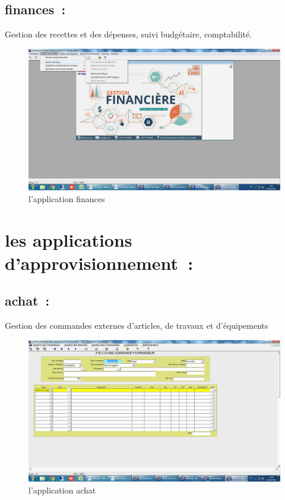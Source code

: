 \documentclass[12pt]{rapportINPTCLOUD}
\begin{document}
\subsection{finances :} Gestion des recettes et des dépenses, suivi budgétaire, comptabilité.
\begin{figure}[H]
\centering
\includegraphics[width=1\linewidth]{img/d.jpg}
\caption{l'application finances}
\label{fig:finances}
\end{figure}
\newpage
	\section{\textcolor{sectioncolor}{les applications d’approvisionnement :}}
\subsection{achat :}   Gestion des commandes externes d'articles, de travaux et d'équipements
\begin{figure}[H]
	\centering
	\includegraphics[width=1\linewidth]{img/e.jpg}
	\caption{l'application achat}
	\label{fig:achat}
\end{figure}
\newpage
\end{document}
